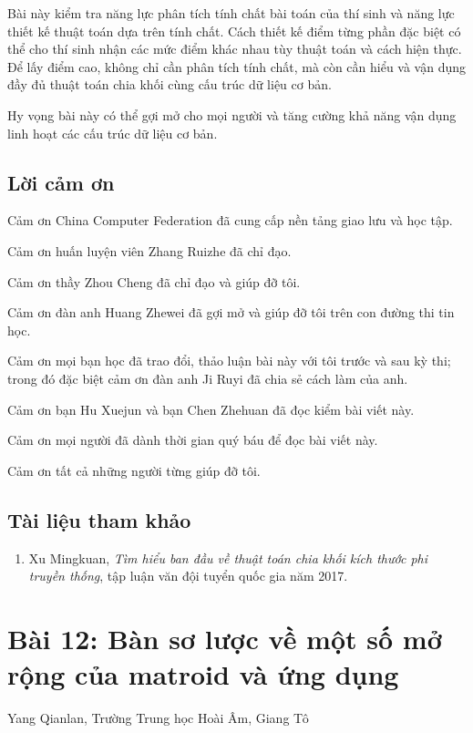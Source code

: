 \documentclass[11pt]{article}
\begin{document}
Bài này kiểm tra năng lực phân tích tính chất bài toán của thí sinh và năng lực
thiết kế thuật toán dựa trên tính chất. Cách thiết kế điểm từng phần đặc biệt có
thể cho thí sinh nhận các mức điểm khác nhau tùy thuật toán và cách hiện thực.
Để lấy điểm cao, không chỉ cần phân tích tính chất, mà còn cần hiểu và vận dụng
đầy đủ thuật toán chia khối cùng cấu trúc dữ liệu cơ bản.

Hy vọng bài này có thể gợi mở cho mọi người và tăng cường khả năng vận dụng linh
hoạt các cấu trúc dữ liệu cơ bản.

\subsection*{Lời cảm ơn}

Cảm ơn China Computer Federation đã cung cấp nền tảng giao lưu và học tập.

Cảm ơn huấn luyện viên Zhang Ruizhe đã chỉ đạo.

Cảm ơn thầy Zhou Cheng đã chỉ đạo và giúp đỡ tôi.

Cảm ơn đàn anh Huang Zhewei đã gợi mở và giúp đỡ tôi trên con đường thi tin học.

Cảm ơn mọi bạn học đã trao đổi, thảo luận bài này với tôi trước và sau kỳ thi;
trong đó đặc biệt cảm ơn đàn anh Ji Ruyi đã chia sẻ cách làm của anh.

Cảm ơn bạn Hu Xuejun và bạn Chen Zhehuan đã đọc kiểm bài viết này.

Cảm ơn mọi người đã dành thời gian quý báu để đọc bài viết này.

Cảm ơn tất cả những người từng giúp đỡ tôi.

\subsection*{Tài liệu tham khảo}

\begin{enumerate}
  \item Xu Mingkuan, \emph{Tìm hiểu ban đầu về thuật toán chia khối kích thước
  phi truyền thống}, tập luận văn đội tuyển quốc gia năm 2017.
\end{enumerate}

\section{Bài 12: Bàn sơ lược về một số mở rộng của matroid và ứng dụng}

\begin{center}
Yang Qianlan, Trường Trung học Hoài Âm, Giang Tô
\end{center}
\end{document}
